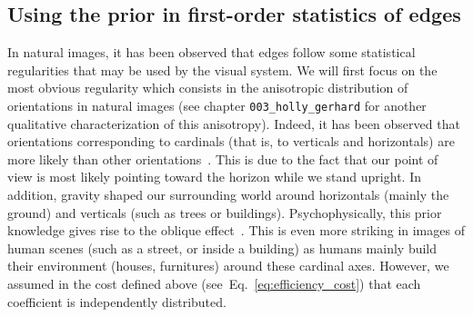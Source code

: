 \documentclass[a4paper, 11pt]{book}
\newcommand{\seeEq}[1]{Eq.~\ref{eq:#1}}%
\begin{document}
\subsection{Using the prior in first-order statistics of edges}
\label{sec:laughlin}
In natural images, it has been observed that edges follow some statistical regularities that may be used by the visual system.
We will first focus on the most obvious regularity which consists in the anisotropic distribution of orientations in natural images (see chapter \verb+003_holly_gerhard+ for another qualitative characterization of this anisotropy).
Indeed, it has been observed that orientations corresponding to cardinals (that is, to verticals and horizontals) are more likely than other orientations~\citep{Ganguli10,Girshick11}.
This is due to the fact that our point of view is most likely pointing toward the horizon while we stand  upright. In addition, gravity shaped our surrounding world around horizontals (mainly the ground) and verticals (such as trees or buildings). Psychophysically, this prior knowledge gives rise to the oblique effect~\citep{Keil00}.
This is even more striking in images of human scenes (such as a street, or inside a building) as humans mainly build their environment (houses, furnitures) around these cardinal axes. However, we assumed in the cost defined above (see~\seeEq{efficiency_cost}) that each coefficient is independently distributed.
\end{document}
